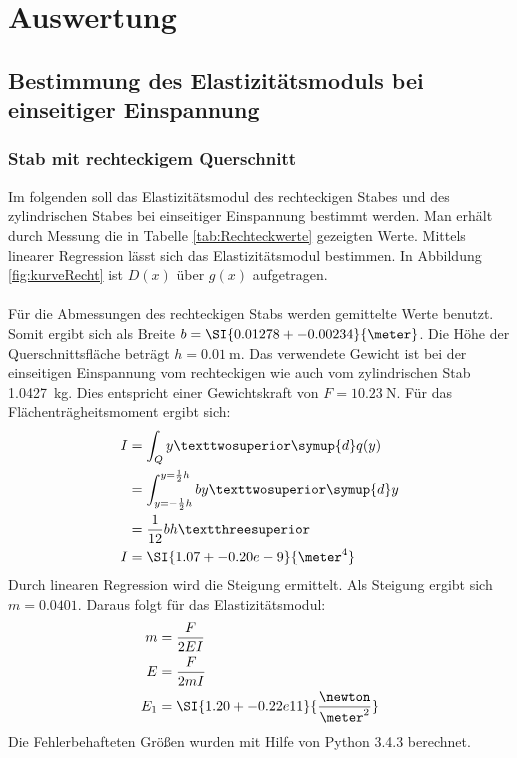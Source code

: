\section{Auswertung}
\label{sec:Auswertung}
\subsection{Bestimmung des Elastizitätsmoduls bei einseitiger Einspannung}
\subsubsection{Stab mit rechteckigem Querschnitt}
\label{sec:rechteck}
Im folgenden soll das Elastizitätsmodul des rechteckigen Stabes und des zylindrischen Stabes bei einseitiger Einspannung bestimmt werden.
Man erhält durch Messung die in Tabelle \ref{tab:Rechteckwerte} gezeigten Werte. Mittels linearer Regression lässt sich das Elastizitätsmodul bestimmen.
In Abbildung \ref{fig:kurveRecht} ist $D(x)$ über $g(x)$ aufgetragen.
\\
\\
Für die Abmessungen des rechteckigen Stabs werden gemittelte Werte benutzt. Somit ergibt sich als Breite $b=\SI{0.01278+-0.00234}{\meter}$.
Die Höhe der Querschnittsfläche beträgt $h=\SI{0.01}{\meter}$.
Das verwendete Gewicht ist bei der einseitigen Einspannung vom rechteckigen wie auch vom zylindrischen Stab \SI{1.0427}{\kilo\gram}. Dies entspricht einer
Gewichtskraft von $F=\SI{10.23}{\newton}$. Für das Flächenträgheitsmoment ergibt sich:
\begin{align*}
  I &= \int_Q y² \symup{d}q(y) \\
    &= \int_{y=-\frac{1}{2}h}^{y=\frac{1}{2}h} by² \symup{d}y \\
    &= \frac{1}{12}bh³ \\
  I &= \SI{1.07+-0.20e-9}{\meter^4}\\
\end{align*}
Durch linearen Regression wird die Steigung ermittelt. Als Steigung ergibt sich $m=\num{0.0401}$. Daraus folgt für das Elastizitätsmodul:
\begin{align*}
  m   &= \frac{F}{2EI} \\
  E   &= \frac{F}{2mI} \\
  E_1 &= \SI{1.20+-0.22e11}{\frac{\newton}{\meter^2}} \\
\end{align*}
Die Fehlerbehafteten Größen wurden mit Hilfe von Python 3.4.3 berechnet.

